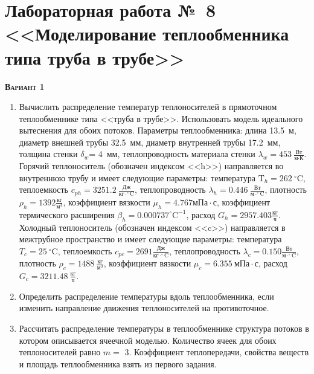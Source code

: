 \section{Лабораторная работа №~8 <<Моделирование теплообменника типа труба в трубе>>}

  \addtocounter{nlab}{1}\textsc{\textbf{Вариант 1}}

\begin{enumerate} 
\item Вычислить распределение температур теплоносителей в прямоточном теплообменнике типа <<труба в трубе>>. Использовать модель идеального вытеснения для обоих потоков. Параметры теплообменника: длина  13.5~м, диаметр внешней трубы 32.5~мм,  диаметр внутренней трубы 17.2~мм, толщина стенки $\delta_{w}$=     4~мм,  теплопроводность материала стенки $\lambda_{w}=  453~\frac{\text{Вт}}{\text{м} \cdot \text{К}}$.  Горячий теплоноситель (обозначен индексом <<h>>) направляется во внутреннюю трубу и	 имеет следующие параметры: температура $\text{T}_{h}= 262~^\circ\mathrm{C}$, теплоемкость	  $c_{p{h}}= 3251.2~\frac{\text{Дж}}{\text{кг} \cdot ^\circ\mathrm{C}}$, теплопроводность 		$\lambda_{h}= 0.446~\frac{\text{Вт}}{\text{м} \cdot ^\circ\mathrm{C}}$, плотность 		$\rho_{h}= 1392 \frac{\text{кг}}{\text{м}^3}$, коэффициент вязкости $\mu_{h}=4.767 \text{мПа} 		\cdot \text{с} $, коэффициент термического расширения $\beta_{h}=0.000737 ^\circ\mathrm{C}^{-1}$,		 расход $G_{h}= 2957.403 \frac{\text{кг}}{\text{ч}}$. Холодный теплоноситель (обозначен индексом <<c>>) 		 направляется в межтрубное пространство и имеет следующие параметры: температура $T_{c}=   25		 ~^\circ\mathrm{C}$, теплоемкость $c_{p{c}}= 2691 \frac{\text{Дж}}{\text{кг} \cdot ^\circ\mathrm{C}}$,			 теплопроводность $\lambda_{c}=0.150 \frac{\text{Вт}}{\text{м} \cdot ^\circ\mathrm{C}}$, плотность 			 $\rho_{c}=  1488~\frac{\text{кг}}{\text{м}^3}$, коэффициент вязкости $\mu_{c}=6.355~\text{мПа} \cdot \text{с} $, 			 расход $G_{c}=3211.48~\frac{\text{кг}}{\text{ч}}$. 

\item Определить распределение температуры вдоль теплообменника, если 	изменить направление движения теплоносителей на противоточное.

\item Рассчитать распределение температуры в теплообменнике структура потоков в котором описывается ячеечной моделью. Количество ячеек для обоих теплоносителей равно $m = $ 3. Коэффициент теплопередачи, свойства веществ и площадь теплообменника взять из первого задания.

\end{enumerate}

